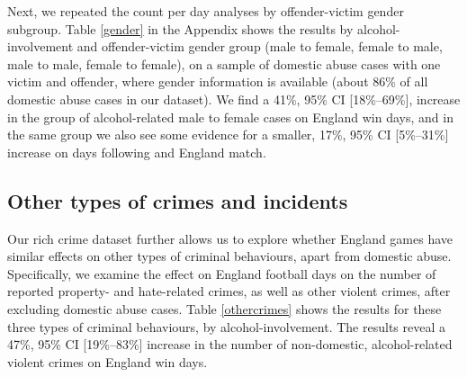 \documentclass[12pt, a4paper]{article}
\begin{document}
 Next, we repeated the count per day analyses by offender-victim gender subgroup. Table \ref{gender} in the Appendix shows the results by alcohol-involvement and offender-victim gender group (male to female, female to male, male to male, female to female), on a sample of domestic abuse cases with one victim and offender, where gender information is available (about 86\% of all domestic abuse cases in our dataset). We find a 41\%, 95\% CI [18\%--69\%], increase in the group of alcohol-related male to female cases on England win days, and in the same group we also see some evidence for a smaller, 17\%, 95\% CI [5\%--31\%] increase on days following and England match.



\subsection{Other types of crimes and incidents}


Our rich crime dataset further allows us to explore whether England games have similar effects on other types of criminal behaviours, apart from domestic abuse. Specifically, we examine the effect on England football days on the number of reported property- and hate-related crimes, as well as other violent crimes, after excluding domestic abuse cases. Table \ref{othercrimes} shows the results for these three types of criminal behaviours, by alcohol-involvement. The results reveal a 47\%, 95\% CI [19\%--83\%] increase in the number of non-domestic, alcohol-related violent crimes on England win days.
\end{document}
